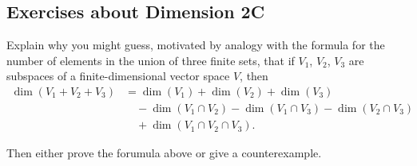 \subsection*{Exercises about Dimension 2C}

\setcounter{xrcscount}{19}
\begin{xrcs}
  Explain why you might guess, motivated by analogy with the formula for the number of elements in the union of three finite sets, that if $V_1$, $V_2$, $V_3$ are subspaces of a finite-dimensional vector space $V$, then
  \[
    \begin{aligned}
      \dim (V_1 + V_2 + V_3) &= \dim (V_1) + \dim (V_2) + \dim (V_3) \\
      & \quad - \dim(V_1 \cap V_2) - \dim (V_1 \cap V_3) - \dim (V_2 \cap V_3) \\
      & \quad + \dim (V_1 \cap V_2 \cap V_3).
    \end{aligned}
  \]

  Then either prove the forumula above or give a counterexample.


\end{xrcs}

